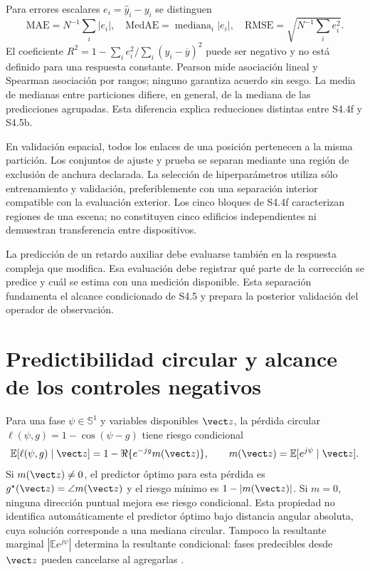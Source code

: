Para errores escalares $e_i=\widehat y_i-y_i$ se distinguen
\begin{equation}
\mathrm{MAE}=N^{-1}\sum_i|e_i|,\quad
\mathrm{MedAE}=\operatorname{mediana}_i|e_i|,\quad
\mathrm{RMSE}=\sqrt{N^{-1}\sum_i e_i^2}.
\end{equation}
El coeficiente $R^2=1-\sum_i e_i^2/\sum_i(y_i-\overline y)^2$ puede ser negativo
y no está definido para una respuesta constante. Pearson mide asociación lineal y
Spearman asociación por rangos; ninguno garantiza acuerdo sin sesgo. La media de
medianas entre particiones difiere, en general, de la mediana de las predicciones
agrupadas. Esta diferencia explica reducciones distintas entre S4.4f y S4.5b.

En validación espacial, todos los enlaces de una posición pertenecen a la misma
partición. Los conjuntos de ajuste y prueba se separan mediante una región de exclusión
de anchura declarada. La selección de hiperparámetros utiliza sólo entrenamiento y
validación, preferiblemente con una separación interior compatible con la evaluación
exterior. Los cinco bloques de S4.4f caracterizan regiones de una escena; no constituyen
cinco edificios independientes ni demuestran transferencia entre dispositivos.

La predicción de un retardo auxiliar debe evaluarse también en la respuesta compleja
que modifica. Esa evaluación debe registrar qué parte de la corrección se predice
y cuál se estima con una medición disponible. Esta separación fundamenta el alcance
condicionado de S4.5 y prepara la posterior validación del operador de observación.


\section{Predictibilidad circular y alcance de los controles negativos}
\label{sec:circular_predictability}

Para una fase $\psi\in\mathbb S^1$ y variables disponibles $\vect z$, la pérdida
circular $\ell(\psi,g)=1-\cos(\psi-g)$ tiene riesgo condicional
\begin{equation}
\mathbb E[\ell(\psi,g)\mid\vect z]
=1-\Re\{e^{-jg}m(\vect z)\},\qquad
m(\vect z)=\mathbb E[e^{j\psi}\mid\vect z].
\end{equation}
Si $m(\vect z)\ne0$, el predictor óptimo para esta pérdida es
$g^\star(\vect z)=\angle m(\vect z)$ y el riesgo mínimo es $1-|m(\vect z)|$.
Si $m=0$, ninguna dirección puntual mejora ese riesgo condicional. Esta propiedad
no identifica automáticamente el predictor óptimo bajo distancia angular absoluta,
cuya solución corresponde a una mediana circular. Tampoco la resultante marginal
$|\mathbb E e^{j\psi}|$ determina la resultante condicional: fases predecibles desde
$\vect z$ pueden cancelarse al agregarlas \citep{Mardia2000Directional,Bishop2006PRML}.

